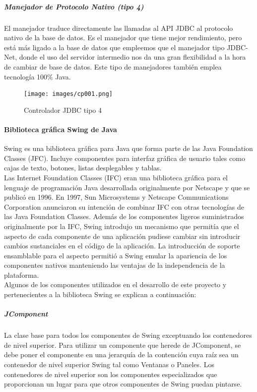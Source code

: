 \begin{description}
\subparagraph{Manejador de Protocolo Nativo (tipo 4)}
El manejador traduce directamente las llamadas al API JDBC al protocolo nativo de la base de datos. Es el manejador que tiene mejor rendimiento, pero est\'a m\'as ligado a la base de datos que empleemos que el manejador tipo JDBC-Net, donde el uso del servidor intermedio nos da una gran flexibilidad a la hora de cambiar de base de datos.  Este tipo de manejadores tambi\'en emplea tecnolog\'ia 100\% Java.

\begin{figure}
\centering
\texttt{[image: images/cp001.png]}
\caption{Controlador JDBC tipo 4}
\label{cp001}
\end{figure}

\paragraph{Biblioteca gr\'afica Swing de Java}
Swing es una biblioteca gr\'afica para Java que forma parte de las Java Foundation Classes (JFC). Incluye componentes para interfaz gr\'afica de usuario tales como cajas de texto, botones, listas desplegables y tablas.\\

Las Internet Foundation Classes (IFC) eran una biblioteca gr\'afica para el lenguaje de programaci\'on Java desarrollada originalmente por Netscape y que se public\'o en 1996.  En 1997, Sun Microsystems y Netscape Communications Corporation anunciaron su intenci\'on de combinar IFC con otras tecnolog\'ias de las Java Foundation Classes. Adem\'as de los componentes ligeros suministrados originalmente por la IFC, Swing introdujo un mecanismo que permit\'ia que el aspecto de cada componente de una aplicaci\'on pudiese cambiar sin introducir cambios sustanciales en el c\'odigo de la aplicaci\'on. La introducci\'on de soporte ensamblable para el aspecto permiti\'o a Swing emular la apariencia de los componentes nativos manteniendo las ventajas de la independencia de la plataforma.\\

Algunos de los componentes utilizados en el desarrollo de este proyecto y pertenecientes a la biblioteca Swing se explican a continuaci\'on:

\subparagraph{JComponent}
La clase base para todos los componentes de Swing exceptuando los contenedores de nivel superior.  Para utilizar un componente que herede de JComponent, se debe poner el componente en una jerarqu\'ia de la contenci\'on cuya ra\'iz sea un contenedor de nivel superior Swing tal como Ventanas o Paneles.  Los contenedores de nivel superior son los componentes especializados que proporcionan un lugar para que otros componentes de Swing puedan pintarse.


\end{description}
